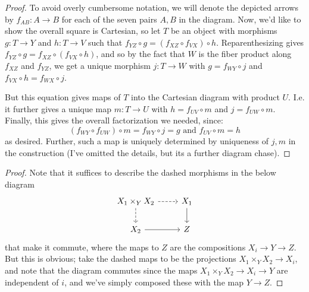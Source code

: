 \documentclass[12pt]{exam}
\begin{document}
\begin{proof}
	To avoid overly cumbersome notation, we will denote the depicted arrows by $f_{AB} : A \to B$ for each of the seven pairs $A,B$ in the diagram. Now, we'd like to show the overall square is Cartesian, so let $T$ be an object with morphisms $g : T \to Y$ and $h : T \to V$ such that $f_{YZ} \circ g = (f_{XZ} \circ f_{VX}) \circ h$. Reparenthesizing gives $f_{YZ} \circ g = f_{XZ} \circ (f_{VX} \circ h)$, and so by the fact that $W$ is the fiber product along $f_{XZ}$ and $f_{YZ}$, we get a unique morphism $j : T \to W$ with $g = f_{WY} \circ j$ and $f_{VX} \circ h = f_{WX} \circ j$.
	
	But this equation gives maps of $T$ into the Cartesian diagram with product $U$. I.e. it further gives a unique map $m : T \to U$ with $h = f_{UV} \circ m$ and $j = f_{UW} \circ m$. Finally, this gives the overall factorization we needed, since:
	\[ (f_{WY} \circ f_{UW}) \circ m = f_{WY} \circ j = g \text{ and } f_{UV} \circ m = h \]
	as desired. Further, such a map is uniquely determined by uniqueness of $j,m$ in the construction (I've omitted the details, but its a further diagram chase).
\end{proof}

\begin{proof}
	Note that it suffices to describe the dashed morphisms in the below diagram
	\[ \begin{tikzcd} X_1 \times_Y X_2 \arrow[dashed]{r}{} \arrow[dashed]{d}{} & X_1 \arrow{d}{} \\ X_2 \arrow{r}{} & Z \end{tikzcd} \]
	that make it commute, where the maps to $Z$ are the compositions $X_i \to Y \to Z$. But this is obvious; take the dashed maps to be the projections $X_1 \times_Y X_2 \to X_i$, and note that the diagram commutes since the maps $X_1 \times_Y X_2 \to X_i \to Y$ are independent of $i$, and we've simply composed these with the map $Y \to Z$.
\end{proof}
\end{document}
